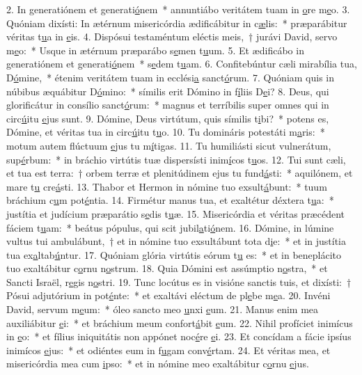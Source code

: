 2. In generatiónem et generati\uline{ó}nem~* annuntiábo veritátem tuam in \uline{o}re m\uline{e}o.
3. Quóniam dixísti: In ætérnum misericórdia ædificábitur in c\uline{æ}lis:~* præparábitur véritas t\uline{u}a in \uline{e}is.
4. Dispósui testaméntum eléctis meis,~† jurávi David, servo m\uline{e}o:~* Usque in ætérnum præparábo s\uline{e}men t\uline{u}um.
5. Et ædificábo in generatiónem et generati\uline{ó}nem~* s\uline{e}dem t\uline{u}am.
6. Confitebúntur cæli mirabília tua, D\uline{ó}mine,~* étenim veritátem tuam in ecclési\uline{a} sanct\uline{ó}rum.
7. Quóniam quis in núbibus æquábitur D\uline{ó}mino:~* símilis erit Dómino in f\uline{í}liis D\uline{e}i?
8. Deus, qui glorificátur in consílio sanct\uline{ó}rum:~* magnus et terríbilis super omnes qui in circ\uline{ú}itu \uline{e}jus sunt.
9. Dómine, Deus virtútum, quis símilis t\uline{i}bi?~* potens es, Dómine, et véritas tua in circ\uline{ú}itu t\uline{u}o.
10. Tu domináris potestáti m\uline{a}ris:~* motum autem flúctuum \uline{e}jus tu m\uline{í}tigas.
11. Tu humiliásti sicut vulnerátum, sup\uline{é}rbum:~* in bráchio virtútis tuæ dispersísti inim\uline{í}cos t\uline{u}os.
12. Tui sunt cæli, et tua est terra:~† orbem terræ et plenitúdinem ejus tu fund\uline{á}sti:~* aquilónem, et mare t\uline{u} cre\uline{á}sti.
13. Thabor et Hermon in nómine tuo exsult\uline{á}bunt:~* tuum bráchium c\uline{u}m pot\uline{é}ntia.
14. Firmétur manus tua, et exaltétur déxtera t\uline{u}a:~* justítia et judícium præparátio s\uline{e}dis t\uline{u}æ.
15. Misericórdia et véritas præcédent fáciem t\uline{u}am:~* beátus pópulus, qui scit jubil\uline{a}ti\uline{ó}nem.
16. Dómine, in lúmine vultus tui ambulábunt,~† et in nómine tuo exsultábunt tota d\uline{i}e:~* et in justítia tua ex\uline{a}ltab\uline{ú}ntur.
17. Quóniam glória virtútis eórum t\uline{u} es:~* et in beneplácito tuo exaltábitur c\uline{o}rnu n\uline{o}strum.
18. Quia Dómini est assúmptio n\uline{o}stra,~* et Sancti Israël, r\uline{e}gis n\uline{o}stri.
19. Tunc locútus es in visióne sanctis tuis, et dixísti:~† Pósui adjutórium in pot\uline{é}nte:~* et exaltávi eléctum de pl\uline{e}be m\uline{e}a.
20. Invéni David, servum m\uline{e}um:~* óleo sancto meo \uline{u}nxi \uline{e}um.
21. Manus enim mea auxiliábitur \uline{e}i:~* et bráchium meum confort\uline{á}bit \uline{e}um.
22. Nihil profíciet inimícus in \uline{e}o:~* et fílius iniquitátis non appónet noc\uline{é}re \uline{e}i.
23. Et concídam a fácie ipsíus inimícos \uline{e}jus:~* et odiéntes eum in f\uline{u}gam conv\uline{é}rtam.
24. Et véritas mea, et misericórdia mea cum \uline{i}pso:~* et in nómine meo exaltábitur c\uline{o}rnu \uline{e}jus.
